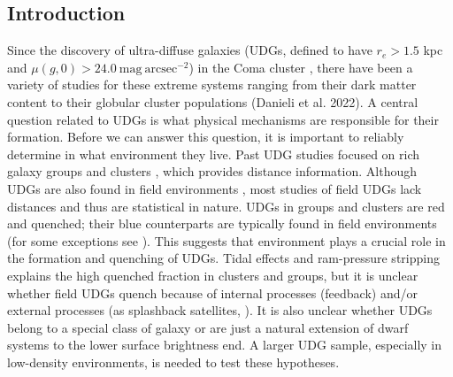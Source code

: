 \documentclass[twocolumn,astrosymb,twocolappendix]{aastex631}
\begin{document}
\begin{CJK*}{UTF8}{gbsn}

\begin{abstract}

\end{abstract}



\section{Introduction} \label{sec:intro}

Since the discovery of ultra-diffuse galaxies (UDGs, defined to have $r_e > 1.5$ kpc and $\mu(g,0)>24.0\ \mathrm{mag\ arcsec^{-2}}$) in the Coma cluster \citep{vanDokkum2015}, there have been a variety of studies for these extreme systems ranging from their dark matter content \citep{vanDokkum2018,vanDokkum2019} to their globular cluster populations (Danieli et al. 2022). A central question related to UDGs is what physical mechanisms are responsible for their formation. Before we can answer this question, it is important to reliably determine in what environment they live.
Past UDG studies focused on rich galaxy groups and clusters \citep[e.g.,][]{Yagi2016,Zaritsky2019}, which provides distance information. Although UDGs are also found in field environments \citep{Prole2019,Tanoglidis2021,Kadowaki2021}, most studies of field UDGs lack distances and thus are statistical in nature. UDGs in groups and clusters are red and quenched; their blue counterparts are typically found in field environments (for some exceptions see \citealt{Roman2019,Prole2019}). This suggests that environment plays a crucial role in the formation and quenching of UDGs. Tidal effects and ram-pressure stripping explains the high quenched fraction in clusters and groups, but it is unclear whether field UDGs quench because of internal processes (feedback) and/or external processes (as splashback satellites, \citealt{Benavides2021}). It is also unclear whether UDGs belong to a special class of galaxy or are just a natural extension of dwarf systems to the lower surface brightness end. A larger UDG sample, especially in low-density environments, is needed to test these hypotheses.


\end{CJK*}
\end{document}
